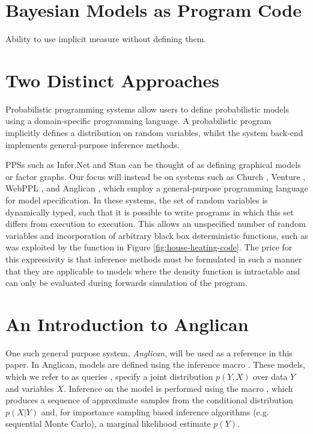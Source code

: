 

\section{Bayesian Models as Program Code}
\label{sec:probprog:models}


Ability to use implicit measure without defining them.

\section{Two Distinct Approaches}
\label{sec:probprog:two}

Probabilistic programming systems allow users to define probabilistic models using a domain-specific programming language. A probabilistic program implicitly defines a distribution on random variables, whilst the system back-end implements general-purpose inference methods.  

PPSs such as Infer.Net \citep{minka_software_2010} and Stan \citep{carpenter2015stan} can be thought of as defining graphical models or factor graphs.  Our focus will instead be on systems such as Church \citep{goodman_uai_2008}, Venture \citep{mansinghka2014venture}, WebPPL \citep{goodman_book_2014}, and Anglican \citep{wood2014new}, which employ a general-purpose programming language for model specification. In these systems, the set of random variables is dynamically typed, such that it is possible to write programs in which this set differs from execution to execution.  This allows an unspecified number of random variables and incorporation of arbitrary black box deterministic functions, such as was exploited by the \simulatec function in Figure \ref{fig:house-heating-code}. The price for this expressivity is that inference methods must be formulated in such a manner that they are applicable to models where the density function is intractable and can only be evaluated during forwards simulation of the program. 


\section{An Introduction to Anglican}
\label{sec:probprog:anglican}

One such general purpose system, \emph{Anglican}, will be used as a reference in this paper.  In Anglican, models are defined using the inference macro . These models, which we refer to as queries \citep{goodman_uai_2008}, specify a joint distribution $p(Y,X)$ over data $Y$ and variables $X$. Inference on the model is performed using the macro \doquery, which produces a sequence of approximate samples from the conditional distribution $p(X|Y)$ and, for importance sampling based inference algorithms (e.g. sequential Monte Carlo), a marginal likelihood estimate $p(Y)$.  

